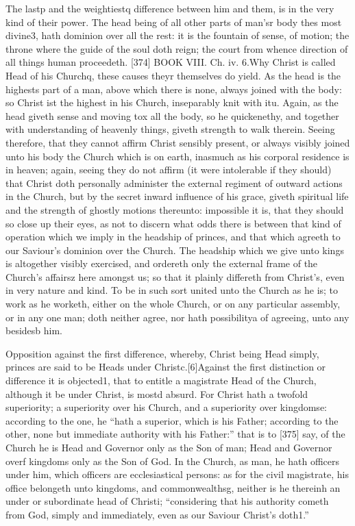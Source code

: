 The lastp and the weightiestq difference between him and them, is in the very kind of their power. The head being of all other parts of man’sr body thes most divine3, hath dominion over all the rest: it is the fountain of sense, of motion; the throne where the guide of the soul doth reign; the court from whence direction of all things human proceedeth. [374] BOOK VIII. Ch. iv. 6.Why Christ is called Head of his Churchq, these causes theyr themselves do yield. As the head is the highests part of a man, above which there is none, always joined with the body: so Christ ist the highest in his Church, inseparably knit with itu. Again, as the head giveth sense and moving tox all the body, so he quickenethy, and together with understanding of heavenly things, giveth strength to walk therein. Seeing therefore, that they cannot affirm Christ sensibly present, or always visibly joined unto his body the Church which is on earth, inasmuch as his corporal residence is in heaven; again, seeing they do not affirm (it were intolerable if they should) that Christ doth personally administer the external regiment of outward actions in the Church, but by the secret inward influence of his grace, giveth spiritual life and the strength of ghostly motions thereunto: impossible it is, that they should so close up their eyes, as not to discern what odds there is between that kind of operation which we imply in the headship of princes, and that which agreeth to our Saviour’s dominion over the Church. The headship which we give unto kings is altogether visibly exercised, and ordereth only the external frame of the Church’s affairsz here amongst us; so that it plainly differeth from Christ’s, even in very nature and kind. To be in such sort united unto the Church as he is; to work as he worketh, either on the whole Church, or on any particular assembly, or in any one man; doth neither agree, nor hath possibilitya of agreeing, unto any besidesb him.

Opposition against the first difference, whereby, Christ being Head simply, princes are said to be Heads under Christc.[6]Against the first distinction or difference it is objected1, that to entitle a magistrate Head of the Church, although it be under Christ, is mostd absurd. For Christ hath a twofold superiority; a superiority over his Church, and a superiority over kingdomse: according to the one, he “hath a superior, which is his Father; according to the other, none but immediate authority with his Father:” that is to [375] say, of the Church he is Head and Governor only as the Son of man; Head and Governor overf kingdoms only as the Son of God. In the Church, as man, he hath officers under him, which officers are ecclesiastical persons: as for the civil magistrate, his office belongeth unto kingdoms, and commonwealthsg, neither is he thereinh an under or subordinate head of Christi; “considering that his authority cometh from God, simply and immediately, even as our Saviour Christ’s doth1.”

